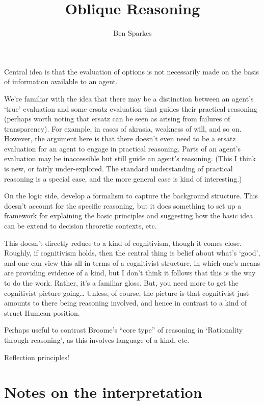 \documentclass[10pt]{article}
\title{Oblique Reasoning}
\author{Ben Sparkes}
\begin{document}
\maketitle

Central idea is that the evaluation of options is not necessarily made on the basis of information available to an agent.

We're familiar with the idea that there may be a distinction between an agent's `true' evaluation and some ersatz evaluation that guides their practical reasoning (perhaps worth noting that ersatz can be seen as arising from failures of transparency).
For example, in cases of akrasia, weakness of will, and so on.
However, the argument here is that there doesn't even need to be a ersatz evaluation for an agent to engage in practical reasoning.
Parts of an agent's evaluation may be inaccessible but still guide an agent's reasoning.
{\color{red} (This I think is new, or fairly under-explored. The standard understanding of practical reasoning is a special case, and the more general case is kind of interesting.)}

On the logic side, develop a formalism to capture the background structure.
This doesn't account for the specific reasoning, but it does something to set up a framework for explaining the basic principles and suggesting how the basic idea can be extend to decision theoretic contexts, etc.


This doesn't directly reduce to a kind of cognitivism, though it comes close.
Roughly, if cognitivism holds, then the central thing is belief about what's `good', and one can view this all in terms of a cognitivist structure, in which one's means are providing evidence of a kind, but I don't think it follows that this is the way to do the work.
Rather, it's a familiar gloss.
But, you need more to get the cognitivist picture going\dots
Unless, of course, the picture is that cognitivist just amounts to there being reasoning involved, and hence in contrast to a kind of struct Humean position.

Perhaps useful to contrast Broome's ``core type'' of reasoning in `Rationality through reasoning', as this involves language of a kind, etc.

Reflection principles!


\section{Notes on the interpretation}
\label{sec:notes-interpretation}
\end{document}
